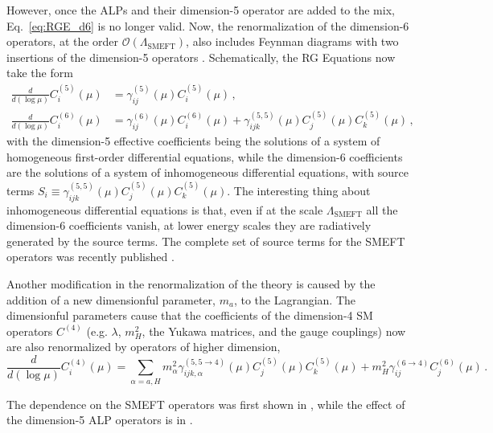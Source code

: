\documentclass[12pt, a4paper]{article}
\begin{document}
However, once the ALPs and their dimension-5 operator are added to the mix, Eq.~\eqref{eq:RGE_d6} is no longer valid.  Now, the renormalization of the dimension-6 operators, at the order $\mathcal{O}(\Lambda_\mathrm{SMEFT})$, also includes Feynman diagrams with two insertions of the dimension-5 operators \cite{Manohar:2018aog}. Schematically, the RG Equations now take the form
\begin{align}
\frac{d}{d(\log \mu)}C^{(5)}_i(\mu) &= \gamma^{(5)}_{ij}(\mu)C^{(5)}_i(\mu)\,, \nonumber\\
\frac{d}{d(\log \mu)}C^{(6)}_i(\mu) &= \gamma^{(6)}_{ij}(\mu)C^{(6)}_i(\mu) + \gamma_{ijk}^{(5,5)}(\mu) C_j^{(5)}(\mu) C_k^{(5)}(\mu) \,,
\end{align}
with the dimension-5 effective coefficients being the solutions of a system of homogeneous first-order differential equations, while the dimension-6 coefficients are the solutions of a system of inhomogeneous differential equations, with source terms $S_i \equiv \gamma_{ijk}^{(5,5)}(\mu) C_j^{(5)}(\mu) C_k^{(5)}(\mu)$. The interesting thing about inhomogeneous differential equations is that, even if at the scale $\Lambda_\mathrm{SMEFT}$ all the dimension-6 coefficients vanish, at lower energy scales they are radiatively generated by the source terms. The complete set of source terms for the SMEFT operators was recently published \cite{Galda:2021hbr}.

Another modification in the renormalization of the theory is caused by the addition of a new dimensionful parameter, $m_a$, to the Lagrangian. The dimensionful parameters cause  that the coefficients of the dimension-4 SM operators $C^{(4)}$ (e.g. $\lambda$, $m_H^2$, the Yukawa matrices, and the gauge couplings) now are also renormalized by operators of higher dimension,
\begin{equation}
\frac{d}{d(\log\mu)} C^{(4)}_i (\mu) = \sum_{\alpha = a, H} m_\alpha^2 \gamma_{ijk,\alpha}^{(5,5\to4)}(\mu) C_j^{(5)}(\mu) C_k^{(5)}(\mu) + m_H^2 \gamma_{ij}^{(6\to4)} C_j^{(6)}(\mu)\,.
\end{equation}

The dependence on the SMEFT operators was first shown in \cite{Jenkins:2013zja}, while the effect of the dimension-5 ALP operators is in \cite{Galda:2021hbr}.
\end{document}
